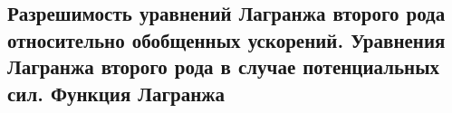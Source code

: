 

\subsection{Разрешимость уравнений Лагранжа второго рода относительно обобщенных ускорений. Уравнения Лагранжа второго рода в случае потенциальных сил. Функция Лагранжа}



